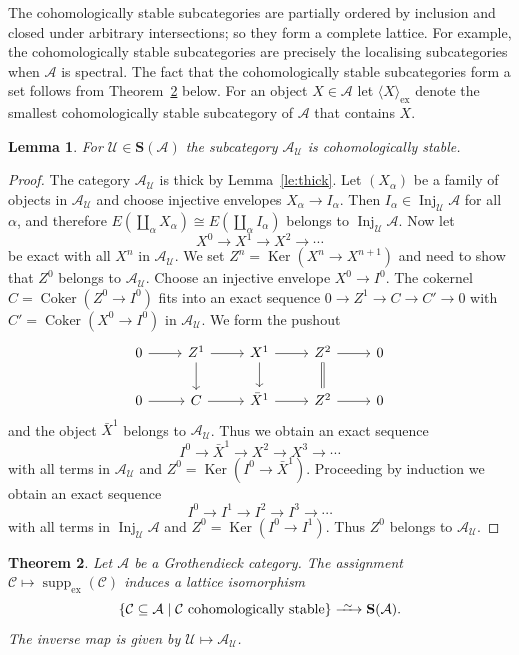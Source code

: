 \documentclass[a4paper]{amsart}
\theoremstyle{plain}
\newtheorem{thm}{Theorem}[section]
\newtheorem{lem}[thm]{Lemma}
\theoremstyle{definition}
\theoremstyle{remark}
\numberwithin{equation}{section}
\newcommand{\Coker}{\operatorname{Coker}}
\newcommand{\Inj}{\operatorname{Inj}}
\newcommand{\Ker}{\operatorname{Ker}}
\newcommand{\suppex}{\operatorname{supp}_{\mathrm{ex}}}
\newcommand{\ex}{\mathrm{ex}}
\newcommand{\longiso}{\xrightarrow{\ \raisebox{-.4ex}[0ex][0ex]{$\scriptstyle{\sim}$}\ }}
\def\A{\mathcal A}
\def\C{\mathcal C}
\def\U{\mathcal U}
\def\bfS{\mathbf S}
\def\a{\alpha}
\begin{document}
The cohomologically stable subcategories are partially ordered by
inclusion and closed under arbitrary intersections; so they form a
complete lattice. For example, the cohomologically stable
subcategories are precisely the localising subcategories when $\A$ is
spectral.  The fact that the cohomologically stable subcategories form a set
follows from Theorem~\ref{th:cohstable} below. For an object $X\in\A$
let $\langle X\rangle_\ex$ denote the smallest cohomologically stable
subcategory of $\A$ that contains $X$.


\begin{lem}\label{le:U}
  For $\U\in\bfS(\A)$ the subcategory $\A_\U$ is cohomologically stable.
\end{lem}
\begin{proof}
  The category $\A_\U$ is thick by Lemma~\ref{le:thick}.  Let $(X_\a)$
  be a family of objects in $\A_\U$ and choose injective envelopes
  $X_\a\to I_\a$. Then $I_\a\in\Inj_\U\A$ for all $\a$, and therefore
  $E(\coprod_\a X_\a)\cong E(\coprod_\a I_\a)$ belongs to
  $\Inj_\U\A$. Now let \[X^0\to X^1\to X^2\to\cdots\] be exact with all
  $X^n$ in $\A_\U$. We set $Z^n=\Ker (X^n\to X^{n+1})$ and need to
  show that $Z^0$ belongs to $\A_\U$. Choose an injective envelope
  $X^0\to I^0$. The cokernel $C=\Coker(Z^0\to I^0)$ fits into an exact
  sequence $0\to Z^1\to C\to C'\to 0$ with $C'=\Coker(X^0\to I^0)$ in
  $\A_\U$. We form the pushout
 \[\begin{tikzcd}
      0\arrow[r]&Z^1\arrow[r]\arrow[d]&X^1\arrow[r]\arrow[d]&
      Z^2\arrow[r]\arrow[d,equal]&0\\
   0\arrow[r]&C\arrow[r]&\bar X^1\arrow[r]&
      Z^2\arrow[r]&0
    \end{tikzcd}\]
and the object $\bar X^1$ belongs to $\A_\U$. Thus we obtain an exact sequence
 \[I^0\to \bar X^1\to X^2\to X^3\to \cdots\] with all
 terms in $\A_\U$ and $Z^0=\Ker (I^0\to\bar X^1)$.
Proceeding by induction we obtain 
 an exact sequence
 \[I^0\to I^1\to I^2\to I^3\to \cdots\] with all terms in $\Inj_\U\A$
 and $Z^0=\Ker (I^0\to I^1)$.  Thus $Z^0$ belongs to
 $\A_\U$.
\end{proof}


\begin{thm}\label{th:cohstable}
  Let $\A$ be a Grothendieck category. The assignment
  $\C\mapsto\suppex(\C)$ induces a lattice isomorphism
\[\{\C\subseteq\A\mid \C\text{ cohomologically stable}\}\longiso\bfS(\A).\]
The inverse map is given by  $\U\mapsto\A_\U$.
\end{thm}
\end{document}
